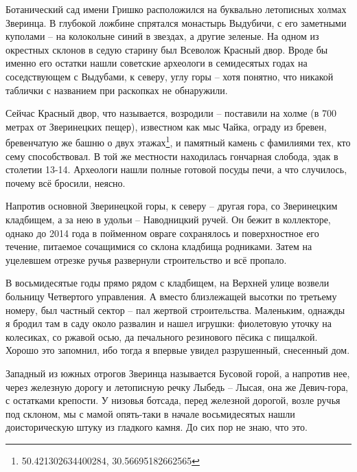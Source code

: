 Ботанический сад имени Гришко расположился на буквально летописных холмах Зверинца. В глубокой ложбине спрятался монастырь Выдубичи, с его заметными куполами – на колокольне синий в звездах, а другие зеленые. На одном из окрестных склонов в седую старину был Всеволож Красный двор. Вроде бы именно его остатки нашли советские археологи в семидесятых годах на соседствующем с Выдубами, к северу, углу горы – хотя понятно, что никакой таблички с названием при раскопках не обнаружили.%

Сейчас Красный двор, что называется, возродили – поставили на холме (в 700 метрах от Зверинецких пещер), известном как мыс Чайка,  ограду из бревен, бревенчатую же башню о двух этажах\footnote{50.421302634400284, 30.56695182662565}, и памятный камень с фамилиями тех, кто сему способствовал. В той же местности находилась гончарная слобода, эдак в столетии 13-14. Археологи нашли полные готовой посуды печи, а что случилось, почему всё бросили, неясно.

Напротив основной Зверинецкой горы, к северу – другая гора, со Зверинецким кладбищем, а за нею в удольи – Наводницкий ручей. Он бежит в коллекторе, однако до 2014 года в пойменном овраге сохранялось и поверхностное его течение, питаемое сочащимися со склона кладбища родниками. Затем на уцелевшем отрезке ручья развернули строительство и всё пропало. 



В восьмидесятые годы прямо рядом с кладбищем, на Верхней улице возвели больницу Четвертого управления. А вместо близлежащей высотки по третьему номеру, был частный сектор – пал жертвой строительства. Маленьким, однажды я бродил там в саду около развалин и нашел игрушки: фиолетовую уточку на колесиках, со ржавой осью, да печального резинового пёсика с пищалкой. Хорошо это запомнил, ибо тогда я впервые увидел разрушенный, снесенный дом.

Западный из южных отрогов Зверинца называется Бусовой горой, а напротив нее, через железную дорогу и летописную речку Лыбедь – Лысая, она же Девич-гора, с остатками крепости. У низовья ботсада, перед железной дорогой, возле ручья под склоном, мы с мамой опять-таки в начале восьмидесятых нашли доисторическую штуку из гладкого камня. До сих пор не знаю, что это. 

